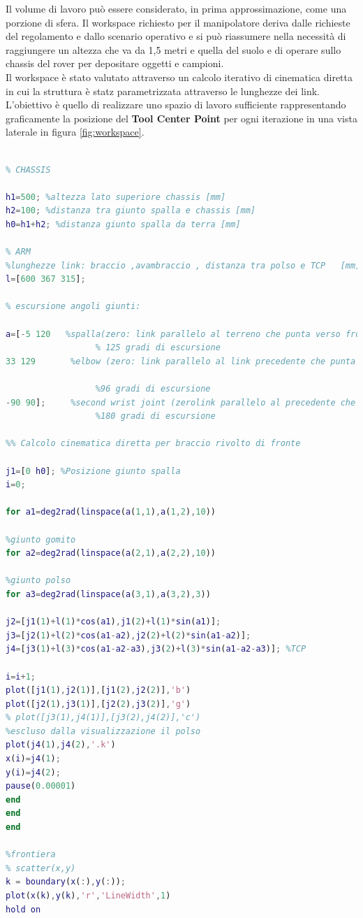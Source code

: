 \documentclass[%
corpo=11pt,
twoside,
 stile=classica,
oldstyle,
greek,%
]{toptesi}
\begin{document}
Il volume di lavoro può essere considerato, in prima approssimazione, come una porzione di sfera.
Il workspace richiesto per il manipolatore deriva dalle richieste del regolamento e dallo scenario operativo e si può riassumere nella necessità di raggiungere un altezza che va da 1,5 metri e quella del suolo e di operare sullo chassis del rover per depositare oggetti e campioni. \\
Il workspace è stato valutato attraverso un calcolo iterativo di cinematica diretta in cui la struttura è statz parametrizzata attraverso le lunghezze dei link. L'obiettivo è quello di realizzare uno spazio di lavoro sufficiente rappresentando graficamente la posizione del \textbf{Tool Center Point} per ogni iterazione in una vista laterale in figura \ref{fig:workspace}. \\
\begin{lstlisting}[language=Matlab]
%%% Dati Rover per il calcolo del workspace%%%

% CHASSIS
 
h1=500; %altezza lato superiore chassis [mm]
h2=100; %distanza tra giunto spalla e chassis [mm]
h0=h1+h2; %distanza giunto spalla da terra [mm]

% ARM
%lunghezze link: braccio ,avambraccio , distanza tra polso e TCP   [mm]
l=[600 367 315];

% escursione angoli giunti: 

a=[-5 120   %spalla(zero: link parallelo al terreno che punta verso fronte rover)
                  % 125 gradi di escursione
33 129   	 %elbow (zero: link parallelo al link precedente che punta fronte rover)
 
	              %96 gradi di escursione
-90 90]; 	 %second wrist joint (zerolink parallelo al precedente che punta fronte rover) 
             	  %180 gradi di escursione

%% Calcolo cinematica diretta per braccio rivolto di fronte

j1=[0 h0]; %Posizione giunto spalla
i=0;

for a1=deg2rad(linspace(a(1,1),a(1,2),10)) 

%giunto gomito
for a2=deg2rad(linspace(a(2,1),a(2,2),10))

%giunto polso
for a3=deg2rad(linspace(a(3,1),a(3,2),3))

j2=[j1(1)+l(1)*cos(a1),j1(2)+l(1)*sin(a1)];
j3=[j2(1)+l(2)*cos(a1-a2),j2(2)+l(2)*sin(a1-a2)];
j4=[j3(1)+l(3)*cos(a1-a2-a3),j3(2)+l(3)*sin(a1-a2-a3)]; %TCP

i=i+1; 
plot([j1(1),j2(1)],[j1(2),j2(2)],'b')
plot([j2(1),j3(1)],[j2(2),j3(2)],'g')
% plot([j3(1),j4(1)],[j3(2),j4(2)],'c')
%escluso dalla visualizzazione il polso 
plot(j4(1),j4(2),'.k')
x(i)=j4(1);
y(i)=j4(2);
pause(0.00001)
end         
end
end 

%frontiera
% scatter(x,y)
k = boundary(x(:),y(:));
plot(x(k),y(k),'r','LineWidth',1)
hold on

\end{lstlisting}
\end{document}
